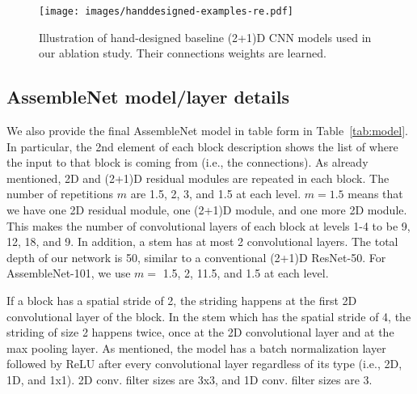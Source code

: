 \documentclass{article} \usepackage{iclr2020_conference,times}
\begin{document}
\begin{figure}
  \centering
   \texttt{[image: images/handdesigned-examples-re.pdf]}
  \caption{Illustration of hand-designed baseline (2+1)D CNN models used in our ablation study. Their connections weights are learned.}
  \label{fig:hand-examples}
\end{figure}









\subsection{AssembleNet model/layer details}

We also provide the final AssembleNet model in table form in Table~\ref{tab:model}. In particular, the 2nd element of each block description shows the list of where the input to that block is coming from (i.e., the connections). As already mentioned, 2D and (2+1)D residual modules are repeated in each block. The number of repetitions $m$ are 1.5, 2, 3, and 1.5 at each level. $m=1.5$ means that we have one 2D residual module, one (2+1)D module, and one more 2D module. This makes the number of convolutional layers of each block at levels 1-4 to be 9, 12, 18, and 9. In addition, a stem has at most 2 convolutional layers. The total depth of our network is 50, similar to a conventional (2+1)D ResNet-50. For AssembleNet-101, we use $m=$ 1.5, 2, 11.5, and 1.5 at each level.

If a block has a spatial stride of 2, the striding happens at the first 2D convolutional layer of the block. In the stem which has the spatial stride of 4, the striding of size 2 happens twice, once at the 2D convolutional layer and at the max pooling layer. As mentioned, the model has a batch normalization layer followed by ReLU after every convolutional layer regardless of its type (i.e., 2D, 1D, and 1x1). 2D conv. filter sizes are 3x3, and 1D conv. filter sizes are 3.
\end{document}
